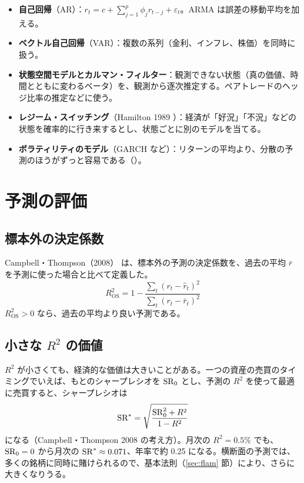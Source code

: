 \begin{itemize}
\item \textbf{自己回帰}（AR）：$r_t = c + \sum_{j=1}^{p} \phi_j r_{t-j} + \varepsilon_t$。ARMA は誤差の移動平均を加える。
\item \textbf{ベクトル自己回帰}（VAR）：複数の系列（金利、インフレ、株価）を同時に扱う。
\item \textbf{状態空間モデルとカルマン・フィルター}：観測できない状態（真の価値、時間とともに変わるベータ）を、観測から逐次推定する。ペアトレードのヘッジ比率の推定などに使う。
\item \textbf{レジーム・スイッチング}（Hamilton 1989 \cite{hamilton1989}）：経済が「好況」「不況」などの状態を確率的に行き来するとし、状態ごとに別のモデルを当てる。
\item \textbf{ボラティリティのモデル}（GARCH など）：リターンの平均より、分散の予測のほうがずっと容易である（）。
\end{itemize}

\section{予測の評価}

\subsection{標本外の決定係数}

Campbell・Thompson（2008）\cite{campbellthompson2008} は、標本外の予測の決定係数を、過去の平均 $\bar r$ を予測に使った場合と比べて定義した。
\begin{equation}
R^2_{\mathrm{OS}} = 1 - \frac{\sum_t (r_t - \hat r_t)^2}{\sum_t (r_t - \bar r_t)^2}
\end{equation}
$R^2_{\mathrm{OS}} > 0$ なら、過去の平均より良い予測である。

\subsection{小さな \texorpdfstring{$R^2$}{R2} の価値}

$R^2$ が小さくても、経済的な価値は大きいことがある。一つの資産の売買のタイミングでいえば、もとのシャープレシオを $\mathrm{SR}_0$ とし、予測の $R^2$ を使って最適に売買すると、シャープレシオは
\begin{equation}
\mathrm{SR}^{*} = \sqrt{\frac{\mathrm{SR}_0^2 + R^2}{1 - R^2}}
\end{equation}
になる（Campbell・Thompson 2008 の考え方）。月次の $R^2 = 0.5\%$ でも、$\mathrm{SR}_0 = 0$ から月次の $\mathrm{SR}^{*} \approx 0.071$、年率で約 0.25 になる。横断面の予測では、多くの銘柄に同時に賭けられるので、基本法則（\ref{sec:flam} 節）により、さらに大きくなりうる。

